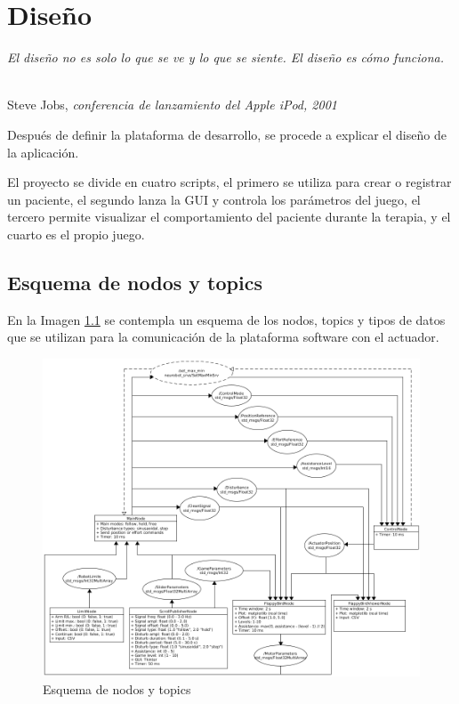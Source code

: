 \chapter{Diseño}
\label{cap:capitulo4}

\begin{flushright}
\begin{minipage}[]{9cm}
\emph{El diseño no es solo lo que se ve y lo que se siente. El diseño es cómo funciona.}\\
\end{minipage}\\

Steve Jobs, \textit{conferencia de lanzamiento del Apple iPod, 2001}\\
\end{flushright}

\vspace{1cm}

Después de definir la plataforma de desarrollo, se procede a explicar el diseño de la aplicación.

El proyecto se divide en cuatro scripts, el primero se utiliza para crear o registrar un paciente, el segundo lanza la GUI y controla los parámetros del juego, el tercero permite visualizar el comportamiento del paciente durante la terapia, y el cuarto es el propio juego.

\section{Esquema de nodos y topics}
\label{section:review}

En la Imagen \ref{fig:nodes} se contempla un esquema de los nodos, topics y tipos de datos que se utilizan para la comunicación de la plataforma software con el actuador.

\begin{figure}[ht!]
	\centering
	\begin{minipage}{1.0\linewidth}
		\centering
		\includegraphics[width=\linewidth]{figs/esquema_nodos.png}
	\end{minipage}
	\caption[Esquema de nodos y topics]{Esquema de nodos y topics}
	\label{fig:nodes}
\end{figure}



